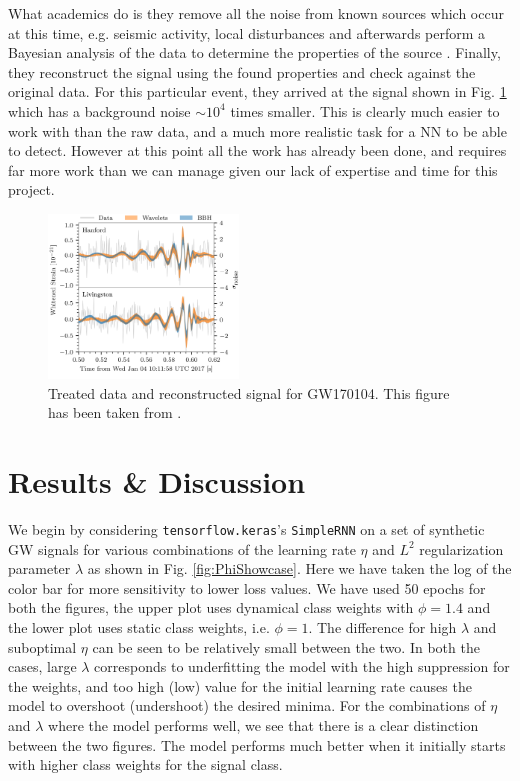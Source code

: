 \documentclass[%
reprint,
amsmath,amssymb,
aps,
]{revtex4-2}
\begin{document}
What academics do is they remove all the noise from known sources which occur at this time, e.g. seismic activity, local disturbances and afterwards perform a Bayesian analysis of the data to determine the properties of the source \cite{LIGOScientific:2017bnn}. Finally, they reconstruct the signal using the found properties and check against the original data. For this particular event, they arrived at the signal shown in Fig. \ref{fig:GW170104Reconstructed} which has a background noise $\sim10^{4}$ times smaller. This is clearly much easier to work with than the raw data, and a much more realistic task for a NN to be able to detect. However at this point all the work has already been done, and requires far more work than we can manage given our lack of expertise and time for this project.

\begin{figure}[H]
	\includegraphics[width=0.45\textwidth]{Figures/GW170104_waveform_reconstructions.svg.png}
	\caption{Treated data and reconstructed signal for GW170104. This figure has been taken from \cite{LIGOScientific:2017bnn}.}
	\label{fig:GW170104Reconstructed}
\end{figure}

\section{Results \& Discussion}
\label{sec:results}
We begin by considering \texttt{tensorflow.keras}'s \texttt{SimpleRNN} on a set of synthetic GW signals for various combinations of the learning rate $\eta$ and $L^2$ regularization parameter $\lambda$ as shown in Fig. \ref{fig:PhiShowcase}. Here we have taken the log of the color bar for more sensitivity to lower loss values. We have used 50 epochs for both the figures, the upper plot uses dynamical class weights with $\phi=1.4$ and the lower plot uses static class weights, i.e. $\phi=1$. The difference for high $\lambda$ and suboptimal $\eta$ can be seen to be relatively small between the two. In both the cases, large $\lambda$ corresponds to underfitting the model with the high suppression for the weights, and too high (low) value for the initial learning rate causes the model to overshoot (undershoot) the desired minima. For the combinations of $\eta$ and $\lambda$ where the model performs well, we see that there is a clear distinction between the two figures. The model performs much better when it initially starts with higher class weights for the signal class.
\end{document}
